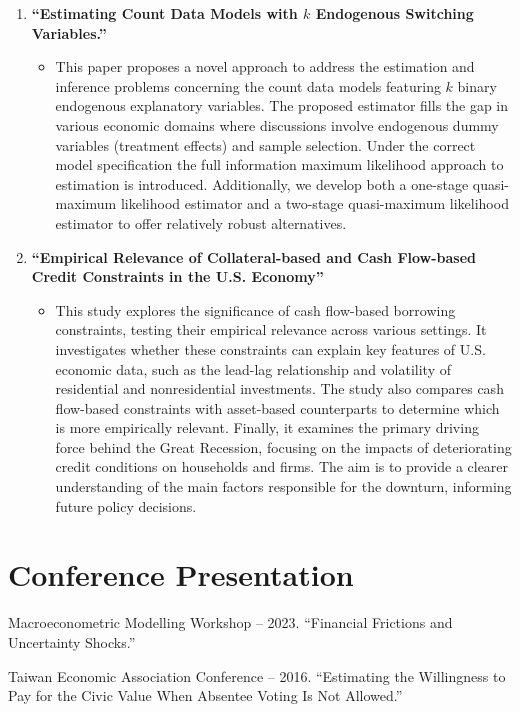 \documentclass{article}
\newcommand{\cvsection}[1]{\section*{\rmfamily#1}}
\begin{document}
\begin{enumerate}[resume]
\section*{Working in Progress}
    \item \textbf{“Estimating Count Data Models with $k$ Endogenous Switching Variables.”}
    \begin{itemize}
        \item[] This paper proposes a novel approach to address the estimation and inference problems concerning the count data models featuring $k$ binary endogenous explanatory variables. The proposed estimator fills the gap in various economic domains where discussions involve endogenous dummy variables (treatment effects) and sample selection. Under the correct model specification the full information maximum likelihood approach to estimation is introduced. Additionally, we develop both a one-stage quasi-maximum likelihood estimator and a two-stage quasi-maximum likelihood estimator to offer relatively robust alternatives. 
    \end{itemize}
\newpage 
    \item \textbf{“Empirical Relevance of Collateral-based and Cash Flow-based Credit Constraints in the U.S. Economy”}
    \begin{itemize}
        \item[] This study explores the significance of cash flow-based borrowing constraints, testing their empirical relevance across various settings. It investigates whether these constraints can explain key features of U.S. economic data, such as the lead-lag relationship and volatility of residential and nonresidential investments. The study also compares cash flow-based constraints with asset-based counterparts to determine which is more empirically relevant. Finally, it examines the primary driving force behind the Great Recession, focusing on the impacts of deteriorating credit conditions on households and firms. The aim is to provide a clearer understanding of the main factors responsible for the downturn, informing future policy decisions.
    \end{itemize}
\end{enumerate}



\cvsection{Conference Presentation}
\indent 

Macroeconometric Modelling Workshop -- 2023. “Financial Frictions and Uncertainty Shocks.”

Taiwan Economic Association Conference -- 2016. “Estimating the Willingness to Pay for the Civic Value When Absentee Voting Is Not Allowed.”
\end{document}

